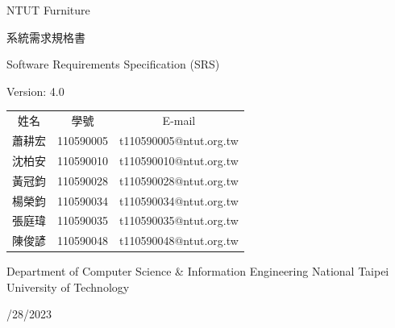 \documentclass[a4paper, 12pt]{article}
\def\myProjectName{NTUT Furniture}
\def\myVersion{4.0}
\newcommand\TwentyTitle{\fontsize{20pt}{24pt}\selectfont}
\newcommand\EighteenTitle{\fontsize{18pt}{20pt}\selectfont}
\newcommand\SixteenTitle{\fontsize{16pt}{18pt}\selectfont}
\begin{document}
\thispagestyle{empty}
\begin{center}
    {\TwentyTitle \myProjectName \par}
    \vspace{6cm}
    {\TwentyTitle 系統需求規格書 \par}
    {\EighteenTitle Software Requirements Specification (SRS) \par}
    {\SixteenTitle Version: \myVersion \par}
    \vspace{4cm}
    {\SixteenTitle
    \renewcommand{\arraystretch}{1.3} %
    \begin{tabular}{ccc}
      姓名 & 學號 & E-mail \\[0.2em]
      蕭耕宏& 110590005& t110590005@ntut.org.tw \\
      沈柏安& 110590010& t110590010@ntut.org.tw \\
      黃冠鈞& 110590028& t110590028@ntut.org.tw \\
      楊榮鈞& 110590034& t110590034@ntut.org.tw \\
      張庭瑋& 110590035& t110590035@ntut.org.tw \\
      陳俊諺& 110590048& t110590048@ntut.org.tw \\
    \end{tabular}
    \renewcommand{\arraystretch}{1} %
    \par}
    \vspace{2cm}
    {\SixteenTitle Department of Computer Science \& Information Engineering National Taipei University of Technology \par}
    \vspace{16pt}
    {\SixteenTitle 12/28/2023 \par}
\end{center}
\clearpage

\renewcommand{\contentsname}{目錄 (Table of Contents)}
\tableofcontents
\newpage



\end{document}
